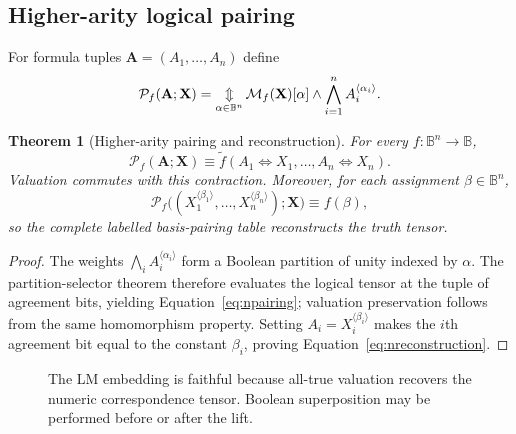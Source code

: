 \documentclass[11pt]{article}
\newtheorem{theorem}{Theorem}[section]
\theoremstyle{definition}
\theoremstyle{remark}
\newcommand{\B}{\mathbb B}
\newcommand{\cC}{\mathcal C}
\newcommand{\cM}{\mathcal M}
\newcommand{\cP}{\mathcal P}
\newcommand{\bigxor}{\mathop{\Updownarrow}\displaylimits}
\begin{document}
\subsection{Higher-arity logical pairing}
For formula tuples $\mathbf A=(A_1,\ldots,A_n)$ define
\begin{equation}
 \cP_f(\mathbf A;\mathbf X)
 =\bigxor_{\alpha\in\B^n}
 \cM_f(\mathbf X)[\alpha]
 \land\bigwedge_{i=1}^n A_i^{\langle\alpha_i\rangle}.
 \label{eq:npairingdef}
\end{equation}

\begin{theorem}[Higher-arity pairing and reconstruction]
For every $f:\B^n\to\B$,
\begin{equation}
 \cP_f(\mathbf A;\mathbf X)
 \equiv
 \widetilde f(A_1\Leftrightarrow X_1,\ldots,A_n\Leftrightarrow X_n).
 \label{eq:npairing}
\end{equation}
Valuation commutes with this contraction.  Moreover, for each assignment $\beta\in\B^n$,
\begin{equation}
 \cP_f\bigl((X_1^{\langle\beta_1\rangle},\ldots,X_n^{\langle\beta_n\rangle});\mathbf X\bigr)
 \equiv f(\beta),
 \label{eq:nreconstruction}
\end{equation}
so the complete labelled basis-pairing table reconstructs the truth tensor.
\end{theorem}
\begin{proof}
The weights $\bigwedge_i A_i^{\langle\alpha_i\rangle}$ form a Boolean partition of unity indexed by $\alpha$.  The partition-selector theorem therefore evaluates the logical tensor at the tuple of agreement bits, yielding Equation~\eqref{eq:npairing}; valuation preservation follows from the same homomorphism property.  Setting $A_i=X_i^{\langle\beta_i\rangle}$ makes the $i$th agreement bit equal to the constant $\beta_i$, proving Equation~\eqref{eq:nreconstruction}.
\end{proof}

\begin{figure}[ht]
\centering
{}
\caption{The LM embedding is faithful because all-true valuation recovers the numeric correspondence tensor.  Boolean superposition may be performed before or after the lift.}
\label{fig:embedding}
\end{figure}
\end{document}
